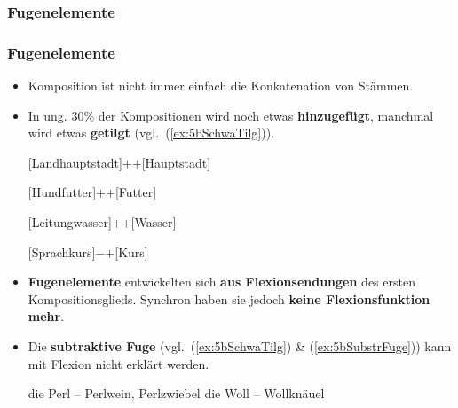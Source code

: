 \subsubsection{Fugenelemente}

\begin{frame}
\frametitle{Fugenelemente}

\begin{itemize}
	\item Komposition ist nicht immer einfach die Konkatenation von Stämmen.
	
	\item In ung. 30\% der Kompositionen wird noch etwas \textbf{hinzugefügt}, manchmal wird etwas \textbf{getilgt} (vgl.\ (\ref{ex:5bSchwaTilg})).
	
	\settowidth{} 
	\eal 
		\ex %
		 {[Landhauptstadt]$+$$+$[Hauptstadt]}
		 
		\ex %
		 {[Hundfutter]$+$$+$[Futter]}
		 
		\ex %
		 {[Leitungwasser]$+$$+$[Wasser]}
		 
		\ex\label{ex:5bSchwaTilg} %
		 {[Sprach\alertred{\_}kurs]$-$$+$[Kurs]}
	\zl
		 
\pause

	\item \textbf{Fugenelemente} entwickelten sich \textbf{aus Flexionsendungen} des ersten Kompositionsglieds. Synchron haben sie jedoch \textbf{keine Flexionsfunktion mehr}.
	
	\item Die \textbf{subtraktive Fuge} (vgl.\ (\ref{ex:5bSchwaTilg}) \& (\ref{ex:5bSubstrFuge})) kann mit Flexion nicht erklärt werden.
	
	\eal \label{ex:5bSubstrFuge}
	\ex die Perl -- Perl\alertred{\_}wein, Perl\alertred{\_}zwiebel
	\ex die Woll -- Woll\alertred{\_}knäuel
	\zl
	
\end{itemize}

\end{frame}


